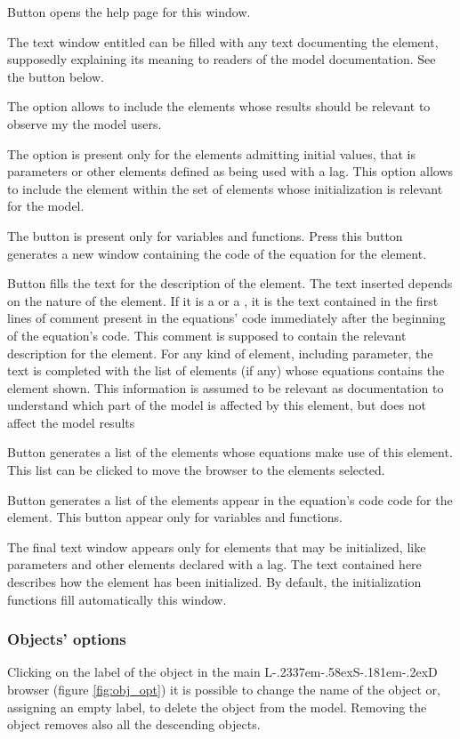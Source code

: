 \documentclass [11pt,a4paper] {book}
\def\LsD{{L\kern-.2337em\lower-.58ex\hbox{S}\kern-.181em\lower-.2ex\hbox{D}}\xspace}
\begin{document}
Button  opens the help page for this window.

The text window entitled  can be filled with any text documenting the element, supposedly explaining its meaning to readers of the model documentation. See the button  below.

The option  allows to include the elements whose results should be relevant to observe my the model users.

The option  is present only for the elements admitting initial values, that is parameters or other elements defined as being used with a lag. This option allows to include the element within the set of elements whose initialization is relevant for the model.

The button  is present only for variables and functions. Press this button generates a new window containing the code of the equation for the element.

Button  fills the text for the description of the element. The text inserted depends on the nature of the element. If it is a  or a , it is the text contained in the first lines of comment present in the equations' code immediately after the beginning of the equation's code. This comment is supposed to contain the relevant description for the element. For any kind of element, including parameter, the text is completed with the list of elements (if any) whose equations contains the element shown. This information is assumed to be relevant as documentation to understand which part of the model is affected by this element, but does not affect the model results

Button  generates a list of the elements whose equations make use of this element. This list can be clicked to move the browser to the elements selected.


Button  generates a list of the elements appear in the equation's code code for the element. This button appear only for variables and functions.

The final text window appears only for elements that may be initialized, like parameters and other elements declared with a lag. The text contained here describes how the element has been initialized. By default, the initialization functions fill automatically this window.


\subsubsection{Objects' options}
Clicking on the label of the object in the main  \LsD browser (figure \ref{fig:obj_opt}) it is possible to change the name of the object or, assigning an empty label, to delete the object from the model. Removing the object removes also all the descending objects. 
\end{document}
